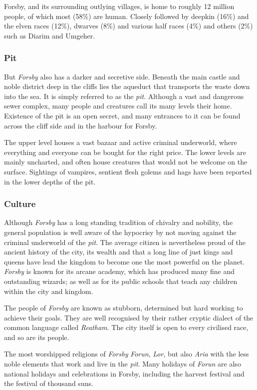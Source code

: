Forsby, and its surrounding outlying villages, is home to roughly 12 million
people, of which most (58\%) are human. Closely followed by deepkin (16\%)
and the elven races (12\%), dwarves (8\%) and various half races (4\%) and
others (2\%) such as Diarim and Umgeher.

\subsubsection*{Pit}

But \emph{Forsby} also has a darker and secretive side. Beneath the main
castle and noble district deep in the cliffs lies the aqueduct that transports
the waste down into the sea. It is simply referred to as the \emph{pit}.
Although a vast and dangerous sewer complex, many people and creatures call
its many levels their home. Existence of the pit is an open secret, and many
entrances to it can be found across the cliff side and in the harbour for
Forsby.

The upper level houses a vast bazaar and active criminal underworld, where
everything and everyone can be bought for the right price. The lower levels
are mainly uncharted, and often house creatures that would not be welcome on
the surface. Sightings of vampires, sentient flesh golems and hags have been
reported in the lower depths of the pit.

\subsubsection*{Culture}

Although \emph{Forsby} has a long standing tradition of chivalry and nobility,
the general population is well aware of the hypocrisy by not moving against the
criminal underworld of the \emph{pit}. The average citizen is nevertheless
proud of the ancient history of the city, its wealth and that a long line of
just kings and queens have lead the kingdom to become one the most powerful on
the planet. \emph{Forsby} is known for its arcane academy, which has produced
many fine and outstanding wizards; as well as for its public schools that
teach any children within the city and kingdom.

The people of \emph{Forsby} are known as stubborn, determined but hard working
to achieve their goals. They are well recognised by their rather cryptic dialect
of the common language called \emph{Reatham}. The city itself is open to every
civilised race, and so are its people.

The most worshipped religions of \emph{Forsby} \emph{Forun}, \emph{Lor}, but
also \emph{Aria} with the less noble elements that work and live in the
\emph{pit}. Many holidays of \emph{Forun} are also national holidays and
celebrations in Forsby, including the harvest festival and the festival of
thousand suns.

